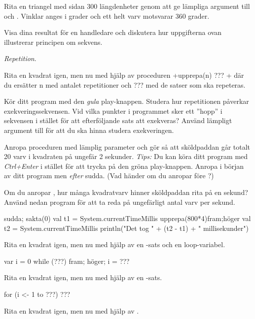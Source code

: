 \Subtask Rita en triangel med sidan 300 längdenheter genom att ge lämpliga argument till  och . Vinklar anges i grader och ett helt varv motsvarar 360 grader.

\Subtask\Checkpoint Visa dina resultat för en handledare och diskutera hur uppgifterna ovan illustrerar principen om sekvens.

\Task \textit{Repetition}. 

\Subtask Rita en kvadrat igen, men nu med hjälp av proceduren \code+upprepa(n){ ??? }+ där du ersätter n med antalet repetitioner och ??? med de satser som ska repeteras. 

\Subtask Kör ditt program med den \emph{gula} play-knappen. Studera hur repetitionen påverkar  exekveringssekvensen. Vid vilka punkter i programmet sker ett ''hopp'' i sekvensen i stället för att efterföljande sats att exekveras? Använd lämpligt argument till  för att du ska hinna studera exekveringen.

\Subtask Anropa proceduren  med lämplig parameter och gör så att sköldpaddan går totalt 20 varv i kvadraten på ungefär 2 sekunder. \emph{Tips:} Du kan köra ditt program med \emph{Ctrl+Enter} i stället för att trycka på den gröna play-knappen. Anropa  i början av ditt program men \emph{efter} sudda. (Vad händer om du anropar  före ?)


\Subtask Om du anropar , hur många kvadratvarv hinner sköldpaddan rita på en sekund? Använd nedan program för att ta reda på ungefärligt antal varv per sekund.
\begin{Code}
sudda; sakta(0)
val t1 = System.currentTimeMillis
upprepa(800*4){fram;höger}
val t2 = System.currentTimeMillis
println("Det tog " + (t2 - t1) + " millisekunder")
\end{Code} 



\Subtask Rita en kvadrat igen, men nu med hjälp av en -sats och en loop-variabel.

\begin{Code}
var i = 0
while (???) {fram; höger; i = ???}
\end{Code} 

\Subtask Rita en kvadrat igen, men nu med hjälp av en -sats.

\begin{Code}
for (i <- 1 to ???) {???}
\end{Code} 

\Subtask Rita en kvadrat igen, men nu med hjälp av .

